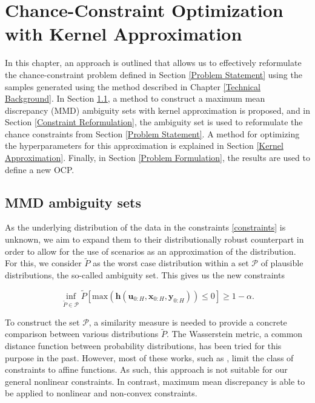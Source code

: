 \chapter{Chance-Constraint Optimization with Kernel Approximation} \label{Technical Approach}

In this chapter, an approach is outlined that allows us to effectively reformulate the chance-constraint problem defined in Section \ref{Problem Statement} using the samples generated using the method described in Chapter \ref{Technical Background}. In Section \ref{SubSec:MMD}, a method to construct a maximum mean discrepancy (MMD) ambiguity sets with kernel approximation is proposed, and in Section \ref{Constraint Reformulation}, the ambiguity set is used to reformulate the chance constraints from Section \ref{Problem Statement}. A method for optimizing the hyperparameters for this approximation is explained in Section \ref{Kernel Approximation}. Finally, in Section \ref{Problem Formulation}, the results are used to define a new OCP.

\section{MMD ambiguity sets} \label{SubSec:MMD}

As the underlying distribution of the data in the constraints \eqref{constraints} is unknown, we aim to expand them to their distributionally robust counterpart in order to allow for the use of scenarios as an approximation of the distribution. For this, we consider $\tilde{P}$ as the worst case distribution within a set $\mathcal{P}$ of plausible distributions, the so-called ambiguity set. This gives us the new constraints

\begin{equation} \label{wc constraints}
\inf\limits_{\tilde{P} \in \mathcal{P}}\tilde{P} \left[ \text{max}(\boldsymbol{h}(\boldsymbol{u}_{0:H},  \boldsymbol{x}_{0:H},  \boldsymbol{y}_{0:H})) \leq 0 \right] \geq 1 - \alpha.
\end{equation}

To construct the set $\mathcal{P}$, a similarity measure is needed to provide a concrete comparison between various distributions $\tilde{P}$. The Wasserstein metric, a common distance function between probability distributions, has been tried for this purpose in the past. However, most of these works, such as \cite{Hota_19}, limit the class of constraints to affine functions. As such, this approach is not suitable for our general nonlinear constraints. In contrast, maximum mean discrepancy \cite{Arthur_12} is able to be applied to nonlinear and non-convex constraints.


